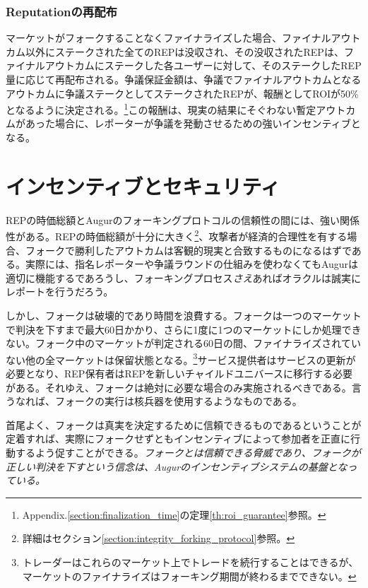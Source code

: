 \documentclass[floatfix,reprint,nofootinbib,amsmath,amssymb,epsfig,pre,floats,letterpaper,groupedaffiliation]{revtex4-1}
\theoremstyle{definition}
\theoremstyle{definition}
\theoremstyle{definition}
\begin{document}
\subsubsection{Reputationの再配布}\label{section:rep_redistribution}

マーケットがフォークすることなくファイナライズした場合、ファイナルアウトカム以外にステークされた全てのREPは没収され、その没収されたREPは、ファイナルアウトカムにステークした各ユーザーに対して、そのステークしたREP量に応じて再配布される。争議保証金額は、争議でファイナルアウトカムとなるアウトカムに争議ステークとしてステークされたREPが、報酬としてROIが50\%となるように決定される。\footnote{Appendix.\ref{section:finalization_time}の定理\ref{th:roi_guarantee}参照。}この報酬は、現実の結果にそぐわない暫定アウトカムがあった場合に、レポーターが争議を発動させるための強いインセンティブとなる。

\section{インセンティブとセキュリティ}\label{section:incentives_and_security}

REPの時価総額とAugurのフォーキングプロトコルの信頼性の間には、強い関係性がある。REPの時価総額が十分に大きく\footnote{詳細はセクション\ref{section:integrity_forking_protocol}参照。}、攻撃者が経済的合理性を有する場合、フォークで勝利したアウトカムは客観的現実と合致するものになるはずである。実際には、指名レポーターや争議ラウンドの仕組みを使わなくてもAugurは適切に機能するであろうし、フォーキングプロセス\textit{さえ}あればオラクルは誠実にレポートを行うだろう。

しかし、フォークは破壊的であり時間を浪費する。フォークは一つのマーケットで判決を下すまで最大60日かかり、さらに1度に1つのマーケットにしか処理できない。フォーク中のマーケットが判定される60日の間、ファイナライズされていない他の全マーケットは保留状態となる。\footnote{トレーダーはこれらのマーケット上でトレードを続行することはできるが、マーケットのファイナライズはフォーキング期間が終わるまでできない。}サービス提供者はサービスの更新が必要となり、REP保有者はREPを新しいチャイルドユニバースに移行する必要がある。それゆえ、フォークは絶対に必要な場合のみ実施されるべきである。言うなれば、フォークの実行は核兵器を使用するようなものである。

首尾よく、フォークは真実を決定するために信頼できるものであるということが定着すれば、実際にフォークせずともインセンティブによって参加者を正直に行動するよう促すことができる。\textit{フォークとは信頼できる脅威であり、フォークが正しい判決を下すという信念は、Augurのインセンティブシステムの基盤となっている。}
\end{document}
